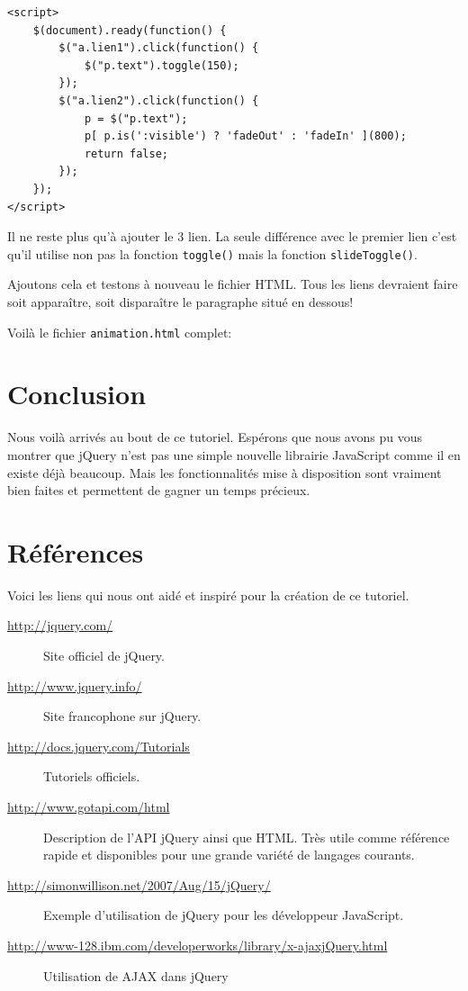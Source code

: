 \documentclass[10pt,a4paper,titlepage]{article}
\begin{document}
\begin{lstlisting}
<script>
	$(document).ready(function() {		
		$("a.lien1").click(function() {
			$("p.text").toggle(150);
		});
		$("a.lien2").click(function() {
			p = $("p.text");
		    p[ p.is(':visible') ? 'fadeOut' : 'fadeIn' ](800);
		    return false;
		});	
	});
</script>
\end{lstlisting}

Il ne reste plus qu'à ajouter le 3 lien. La seule différence avec le premier lien c'est qu'il utilise non pas la fonction \texttt{toggle()} mais la fonction \texttt{slideToggle()}.

Ajoutons cela et testons à nouveau le fichier HTML. Tous les liens devraient faire soit apparaître, soit disparaître le paragraphe situé en dessous!

Voilà le fichier \texttt{animation.html} complet: 



\newpage
\section{Conclusion}

Nous voilà arrivés au bout de ce tutoriel. Espérons que nous avons pu vous montrer que jQuery n'est pas une simple nouvelle librairie JavaScript comme il en existe déjà beaucoup. Mais les fonctionnalités mise à disposition sont vraiment bien faites et permettent de gagner un temps précieux.

\section{Références}

Voici les liens qui nous ont aidé et inspiré pour la création de ce tutoriel.

\small
\begin{description}
	\item[\url{http://jquery.com/}] Site officiel de jQuery.
	\item[\url{http://www.jquery.info/}] Site francophone sur jQuery.
	\item[\url{http://docs.jquery.com/Tutorials}] Tutoriels officiels.
	\item[\url{http://www.gotapi.com/html}] Description de l'API jQuery ainsi que HTML. Très utile comme référence rapide et disponibles pour une grande variété de langages courants.
	\item[\url{http://simonwillison.net/2007/Aug/15/jQuery/}] Exemple d'utilisation de jQuery pour les développeur JavaScript.
	\item[\url{http://www-128.ibm.com/developerworks/library/x-ajaxjQuery.html}] Utilisation de AJAX dans jQuery
\end{description}
\end{document}

